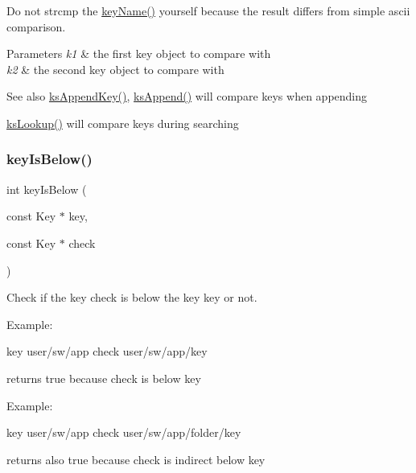 Do not strcmp the \mbox{\hyperlink{group__keyname_ga8e805c726a60da921d3736cda7813513}{key\+Name()}} yourself because the result differs from simple ascii comparison.


\begin{DoxyParams}{Parameters}
{\em k1} & the first key object to compare with \\
\hline
{\em k2} & the second key object to compare with\\
\hline
\end{DoxyParams}
\begin{DoxySeeAlso}{See also}
\mbox{\hyperlink{group__keyset_gaa5a1d467a4d71041edce68ea7748ce45}{ks\+Append\+Key()}}, \mbox{\hyperlink{group__keyset_ga21eb9c3a14a604ee3a8bdc779232e7b7}{ks\+Append()}} will compare keys when appending 

\mbox{\hyperlink{group__keyset_gaa34fc43a081e6b01e4120daa6c112004}{ks\+Lookup()}} will compare keys during searching 
\end{DoxySeeAlso}
\mbox{\label{group__keytest_ga03332b5d97c76a4fd2640aca4762b8df}} 
\subsubsection{\texorpdfstring{keyIsBelow()}{keyIsBelow()}}
{\footnotesize\ttfamily int key\+Is\+Below (\begin{DoxyParamCaption}\item[{const Key $\ast$}]{key,  }\item[{const Key $\ast$}]{check }\end{DoxyParamCaption})}



Check if the key check is below the key key or not. 

Example\+: \begin{DoxyVerb}key user/sw/app
check user/sw/app/key
\end{DoxyVerb}


returns true because check is below key

Example\+: \begin{DoxyVerb}key user/sw/app
check user/sw/app/folder/key
\end{DoxyVerb}


returns also true because check is indirect below key

